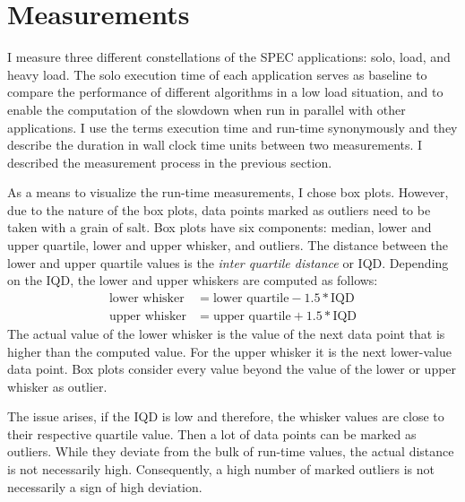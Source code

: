 \section{Measurements}
\label{eval:measurements}

I measure three different constellations of the SPEC applications: solo, load,
and heavy load.
The solo execution time of each application serves as baseline to compare the
performance of different algorithms in a low load situation, and to enable the
computation of the slowdown when run in parallel with other applications.
I use the terms execution time and run-time synonymously and they describe the
duration in wall clock time units between two measurements.
I described the measurement process in the previous section.

As a means to visualize the run-time measurements, I chose box plots.
However, due to the nature of the box plots, data points marked as outliers need
to be taken with a grain of salt.
Box plots have six components: median, lower and upper quartile, lower and
upper whisker, and outliers.
The distance between the lower and upper quartile values is the \emph{inter
quartile distance} or IQD.
Depending on the IQD, the lower and upper whiskers are computed as follows:
%
\begin{align*}
  \text{lower whisker} &= \text{lower quartile} - 1.5 * \text{IQD}\\
  \text{upper whisker} &= \text{upper quartile} + 1.5 * \text{IQD}
\end{align*}
%
The actual value of the lower whisker is the value of the next data point
that is higher than the computed value.
For the upper whisker it is the next lower-value data point.
Box plots consider every value beyond the value of the lower or upper whisker
as outlier.

The issue arises, if the IQD is low and therefore, the whisker values are close
to their respective quartile value.
Then a lot of data points can be marked as outliers.
While they deviate from the bulk of run-time values, the actual distance
is not necessarily high.
Consequently, a high number of marked outliers is not necessarily a sign of
high deviation.

